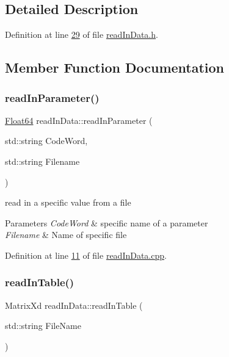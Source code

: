\subsection{Detailed Description}


Definition at line \hyperlink{read_in_data_8h_source_l00029}{29} of file \hyperlink{read_in_data_8h_source}{read\+In\+Data.\+h}.



\subsection{Member Function Documentation}
\mbox{\label{classread_in_data_a9ae979e74958b43424cb6cf4a22043d7}} 
\subsubsection{\texorpdfstring{read\+In\+Parameter()}{readInParameter()}}
{\footnotesize\ttfamily \hyperlink{group___tools_ga3f1431cb9f76da10f59246d1d743dc2c}{Float64} read\+In\+Data\+::read\+In\+Parameter (\begin{DoxyParamCaption}\item[{std\+::string}]{Code\+Word,  }\item[{std\+::string}]{Filename }\end{DoxyParamCaption})}



read in a specific value from a file 


\begin{DoxyParams}{Parameters}
{\em Code\+Word} & specific name of a parameter \\
\hline
{\em Filename} & Name of specific file \\
\hline
\end{DoxyParams}


Definition at line \hyperlink{read_in_data_8cpp_source_l00011}{11} of file \hyperlink{read_in_data_8cpp_source}{read\+In\+Data.\+cpp}.

\mbox{\label{classread_in_data_af616573832efc2c27f07f5f6877b1386}} 
\subsubsection{\texorpdfstring{read\+In\+Table()}{readInTable()}}
{\footnotesize\ttfamily Matrix\+Xd read\+In\+Data\+::read\+In\+Table (\begin{DoxyParamCaption}\item[{std\+::string}]{File\+Name }\end{DoxyParamCaption})}



